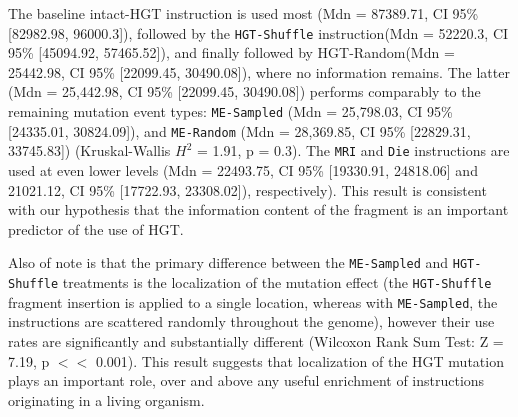 \documentclass[PhD]{msu-thesis}
\begin{document}
The baseline intact-HGT instruction is used most (Mdn = 87389.71, CI 95\% [82982.98, 96000.3]), followed by the \texttt{HGT-Shuffle} instruction(Mdn = 52220.3, CI 95\% [45094.92, 57465.52]), and finally followed by {HGT-Random}(Mdn = 25442.98, CI 95\% [22099.45, 30490.08]), where no information remains.
The latter (Mdn = 25,442.98, CI 95\% [22099.45, 30490.08]) performs comparably to the remaining mutation event types: \texttt{ME-Sampled} (Mdn = 25,798.03, CI 95\% [24335.01, 30824.09]), and \texttt{ME-Random} (Mdn = 28,369.85, CI 95\% [22829.31, 33745.83]) (Kruskal-Wallis $H^2$ = 1.91, p = 0.3). The \texttt{MRI} and \texttt{Die} instructions are used at even lower levels (Mdn = 22493.75, CI 95\% [19330.91, 24818.06] and 21021.12, CI 95\% [17722.93, 23308.02]), respectively).
This result is consistent with our hypothesis that the information content of the fragment is an important predictor of the use of HGT. 

Also of note is that the primary difference between the \texttt{ME-Sampled} and \texttt{HGT-Shuffle} treatments is the localization of the mutation effect
(the \texttt{HGT-Shuffle} fragment insertion is applied to a single location, whereas with \texttt{ME-Sampled}, the instructions are scattered randomly throughout the genome), however their use rates are significantly and substantially different (Wilcoxon Rank Sum Test: Z = 7.19, p $<<$ 0.001). This result suggests that localization of the HGT mutation plays an important role, over and above any useful enrichment of instructions originating in a living organism.

\end{document}
